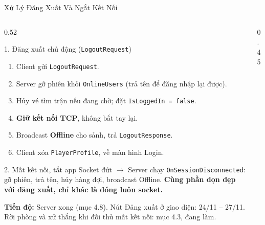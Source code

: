 \begin{frame}[label=logout]{Xử Lý Đăng Xuất Và Ngắt Kết Nối}
  \begin{columns}[T]
    \begin{column}{0.52\textwidth}
      \begin{block}{1. Đăng xuất chủ động (\texttt{LogoutRequest})}
        \begin{enumerate}\setlength{\itemsep}{0pt}\scriptsize
          \item Client gửi \texttt{LogoutRequest}.
          \item Server gỡ phiên khỏi \texttt{OnlineUsers} (trả tên để đăng nhập lại được).
          \item Hủy vé tìm trận nếu đang chờ; đặt \texttt{IsLoggedIn = false}.
          \item \textbf{Giữ kết nối TCP}, không bắt tay lại.
          \item Broadcast \textbf{Offline} cho sảnh, trả \texttt{LogoutResponse}.
          \item Client xóa \texttt{PlayerProfile}, về màn hình Login.
        \end{enumerate}
      \end{block}
      \begin{alertblock}{2. Mất kết nối, tắt app}
        \scriptsize
        Socket đứt $\rightarrow$ Server chạy \texttt{OnSessionDisconnected}: gỡ phiên, trả tên, hủy hàng đợi, broadcast Offline. \textbf{Cùng phần dọn dẹp với đăng xuất, chỉ khác là đóng luôn socket.}
      \end{alertblock}
      \scriptsize\textbf{Tiến độ:} Server xong (mục 4.8). Nút Đăng xuất ở giao diện: 24/11 -- 27/11. Rời phòng và xử thắng khi đối thủ mất kết nối: mục 4.3, đang làm.
    \end{column}
    \begin{column}{0.45\textwidth}
      \centering
\end{column}
\end{columns}
\end{frame}
